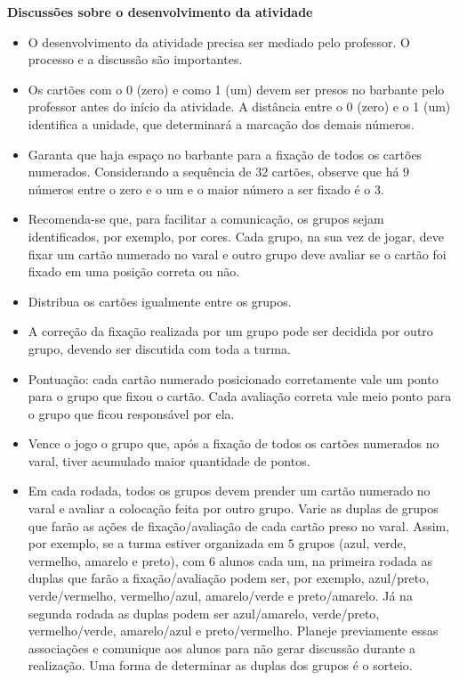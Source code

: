 \documentclass[10 pt,usenames,dvipsnames, oneside]{article}
\begin{document}
\begin{goals}
\textbf{Discussões sobre o desenvolvimento da atividade}
\begin{itemize}
  \item O desenvolvimento da atividade precisa ser mediado pelo professor. O processo e a discussão são importantes.
  \item Os cartões com o 0 (zero) e como 1 (um) devem ser presos no barbante pelo professor antes do início da atividade. A distância entre o 0 (zero) e o 1 (um) identifica a unidade, que determinará a marcação dos demais números.
  \item Garanta que haja espaço no barbante  para a fixação de todos os cartões numerados. Considerando a sequência de 32 cartões, observe que há 9 números entre o zero e o um e o maior número a ser fixado é o 3.
  \item Recomenda-se que, para facilitar a comunicação, os grupos sejam identificados, por exemplo, por cores. Cada grupo, na sua vez de jogar, deve fixar um cartão numerado no varal e outro grupo deve avaliar se o cartão foi fixado em uma posição correta ou não.
  \item Distribua os cartões igualmente entre os grupos.
  \item A correção da fixação realizada por um grupo pode ser decidida por outro grupo, devendo ser discutida com toda a turma.
  \item Pontuação: cada cartão numerado posicionado corretamente vale um ponto para o grupo que fixou o cartão. Cada avaliação correta vale meio ponto para o grupo que ficou responsável por ela.
  \item Vence o jogo o grupo que, após a fixação de todos os cartões numerados no varal, tiver acumulado maior quantidade de pontos.
  \item Em cada rodada, todos os grupos devem prender um cartão numerado no varal e avaliar a colocação feita por outro grupo. Varie as duplas de grupos que farão as ações de fixação/avaliação de cada cartão preso no varal. Assim, por exemplo, se a turma estiver organizada em $5$ grupos (azul, verde, vermelho, amarelo e preto), com 6 alunos cada um, na primeira rodada as duplas que farão a fixação/avaliação podem ser, por exemplo, azul/preto, verde/vermelho, vermelho/azul, amarelo/verde e preto/amarelo. Já na segunda rodada as duplas podem ser azul/amarelo, verde/preto, vermelho/verde, amarelo/azul e preto/vermelho. Planeje previamente essas associações e comunique aos alunos para não gerar discussão durante a realização. Uma forma de determinar as duplas dos grupos é o sorteio. 

\end{itemize}
\end{goals}
\end{document}
